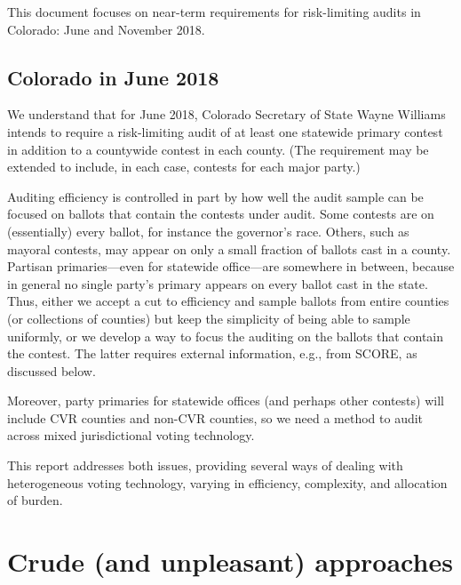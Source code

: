 \documentclass[12pt]{article}
\begin{document}
This document focuses on near-term requirements for risk-limiting audits in Colorado: June and November 2018.

\subsection{Colorado in June 2018}
We understand that for June 2018, Colorado Secretary of State Wayne Williams intends to require
a risk-limiting audit of at least one statewide primary contest in addition
to a countywide contest in each county. (The requirement may be extended to include, in each
case, contests for each major party.)

Auditing efficiency is controlled in part by how well the audit sample can be focused on ballots that
contain the contests under audit.
Some contests are on (essentially) every ballot, for instance the governor's race.
Others, such as mayoral contests, may appear on only a small fraction of ballots cast in
a county.
Partisan primaries---even for statewide office---are somewhere in between,
because in general no single party's primary appears on every ballot cast in the state.
Thus, either we accept a cut to efficiency and sample ballots from 
entire counties (or collections of counties)
but keep the simplicity of being able to sample uniformly, or we develop a way to
focus the auditing on the ballots that contain the contest.
The latter requires external information, e.g., from SCORE, as discussed below.

Moreover, party primaries for statewide offices (and perhaps other contests) will
include CVR counties and non-CVR counties, so we need a method to audit
across mixed jurisdictional voting technology.

This report addresses both issues, providing several ways of dealing with heterogeneous
voting technology, varying in efficiency, complexity, and allocation of burden.

\section{Crude (and unpleasant) approaches}
\end{document}
